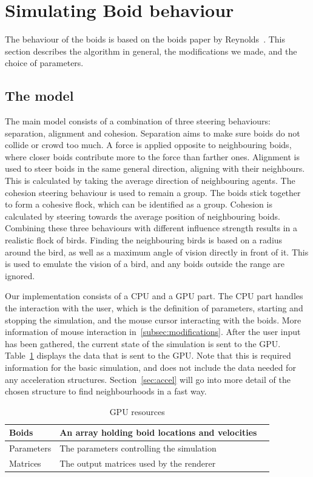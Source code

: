 \documentclass[a4paper, 12pt]{article}
\begin{document}
\section{Simulating Boid behaviour}\label{sec:boids}
The behaviour of the boids is based on the boids paper by Reynolds~\cite{reynolds1987flocks}. This section describes the algorithm in
general, the modifications we made, and the choice of parameters.

\subsection{The model}\label{subsec:model}

The main model consists of a combination of three steering
behaviours: separation, alignment and cohesion. Separation aims to make sure
boids do not collide or crowd too much. A force is applied opposite to
neighbouring boids, where closer boids contribute more to the force than farther ones. Alignment is
used to steer boids in the same general direction, aligning with their
neighbours. This is calculated by taking the average direction of neighbouring
agents. The cohesion steering behaviour is used to remain a group. The boids
stick together to form a cohesive flock, which can be identified as a group.
Cohesion is calculated by steering towards the average position of neighbouring
boids. Combining these three behaviours with different influence strength
results in a realistic flock of birds. Finding the neighbouring birds is based
on a radius around the bird, as well as a maximum angle of vision directly in front of it. This is used to emulate the
vision of a bird, and any boids outside the range are ignored.

Our implementation consists of a CPU and a GPU part. The CPU part handles the
interaction with the user, which is the definition of parameters, starting and
stopping the simulation, and the mouse cursor interacting with the boids. More
information of mouse interaction in~\ref{subsec:modifications}. After the user
input has been gathered, the current state of the simulation is sent to the
GPU\@. Table~\ref{tab:bindings} displays the data that is sent to the GPU\@.
Note that this is required information for the basic simulation, and does not
include the data needed for any acceleration structures. Section~\ref{sec:accel}
will go into more detail of the chosen structure to find neighbourhoods in a
fast way.

\begin{table}[H]
    \centering
    \begin{tabular}{lll}
        \hline
        Boids      & An array holding boid locations and velocities \\ \hline
        Parameters & The parameters controlling the simulation      \\ \hline
        Matrices   & The output matrices used by the renderer       \\ \hline
    \end{tabular}
    \caption{GPU resources}\label{tab:bindings}
\end{table}
\end{document}
